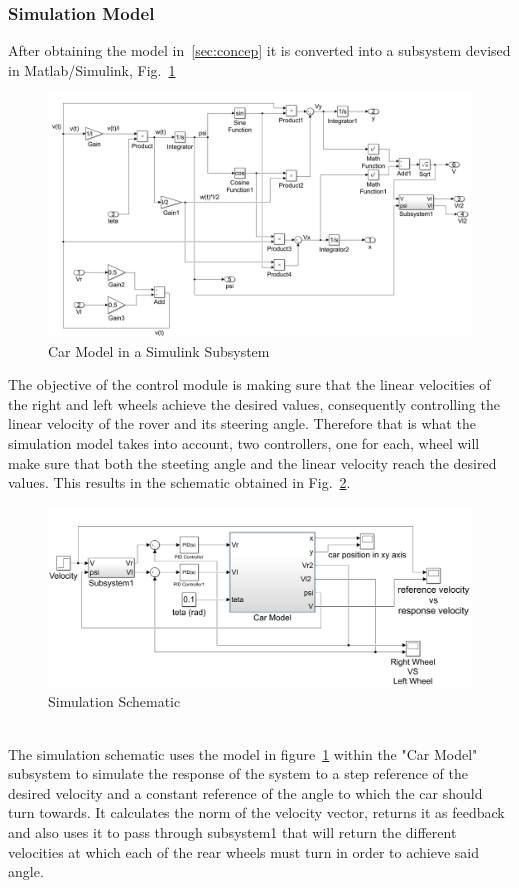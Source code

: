 \subsubsection{Simulation Model}
After obtaining the model in~\ref{sec:concep} it is converted into a subsystem devised in Matlab/Simulink, Fig.~\ref{fig:carModel}
\begin{figure}[!htbp]
\centering
       \includegraphics[page=1,width=1\textwidth]{img/subsystem.png} 
\caption{Car Model in a Simulink Subsystem}
\label{fig:carModel}
\end{figure}
The objective of the control module is making sure that the linear velocities of the right and left wheels achieve the desired values, consequently controlling the linear velocity of the rover and its steering angle. Therefore that is what the simulation model takes into account, two controllers, one for each, wheel will make sure that both the steeting angle and the linear velocity reach the desired values. This results in the schematic obtained in Fig.~\ref{fig:simSche}.
\begin{figure}[!htbp]
\centering
       \includegraphics[page=1,width=1\textwidth]{img/system.png} 
\caption{Simulation Schematic}
\label{fig:simSche}
\end{figure}\\
The simulation schematic uses the model in figure~\ref{fig:carModel} within the "Car Model" subsystem to simulate the response of the system to a step reference of the desired velocity and a constant reference of the angle to which the car should turn towards. It calculates the norm of the velocity vector, returns it as feedback and also uses it to pass through subsystem1 that will return the different velocities at which each of the rear wheels must turn in order to achieve said angle.